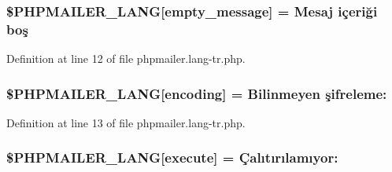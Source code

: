 \subsubsection[{\texorpdfstring{\$\+P\+H\+P\+M\+A\+I\+L\+E\+R\+\_\+\+L\+A\+NG}{$PHPMAILER_LANG}}]{\setlength{\rightskip}{0pt plus 5cm}\$P\+H\+P\+M\+A\+I\+L\+E\+R\+\_\+\+L\+A\+NG\mbox{[}\textquotesingle{}empty\+\_\+message\textquotesingle{}\mbox{]} = \textquotesingle{}Mesaj içeriği boş\textquotesingle{}}\hypertarget{phpmailer_8lang-tr_8php_a33772099f637c9d6c2cd7425e0e37fed}{}\label{phpmailer_8lang-tr_8php_a33772099f637c9d6c2cd7425e0e37fed}


Definition at line 12 of file phpmailer.\+lang-\/tr.\+php.

\subsubsection[{\texorpdfstring{\$\+P\+H\+P\+M\+A\+I\+L\+E\+R\+\_\+\+L\+A\+NG}{$PHPMAILER_LANG}}]{\setlength{\rightskip}{0pt plus 5cm}\$P\+H\+P\+M\+A\+I\+L\+E\+R\+\_\+\+L\+A\+NG\mbox{[}\textquotesingle{}encoding\textquotesingle{}\mbox{]} = \textquotesingle{}Bilinmeyen şifreleme\+: \textquotesingle{}}\hypertarget{phpmailer_8lang-tr_8php_a817f7283f3d54c970a0c10305cc668cc}{}\label{phpmailer_8lang-tr_8php_a817f7283f3d54c970a0c10305cc668cc}


Definition at line 13 of file phpmailer.\+lang-\/tr.\+php.

\subsubsection[{\texorpdfstring{\$\+P\+H\+P\+M\+A\+I\+L\+E\+R\+\_\+\+L\+A\+NG}{$PHPMAILER_LANG}}]{\setlength{\rightskip}{0pt plus 5cm}\$P\+H\+P\+M\+A\+I\+L\+E\+R\+\_\+\+L\+A\+NG\mbox{[}\textquotesingle{}execute\textquotesingle{}\mbox{]} = \textquotesingle{}Çalıtırılamıyor\+: \textquotesingle{}}\hypertarget{phpmailer_8lang-tr_8php_a668217a9563a168f30f2a8548b6ed5a9}{}\label{phpmailer_8lang-tr_8php_a668217a9563a168f30f2a8548b6ed5a9}



